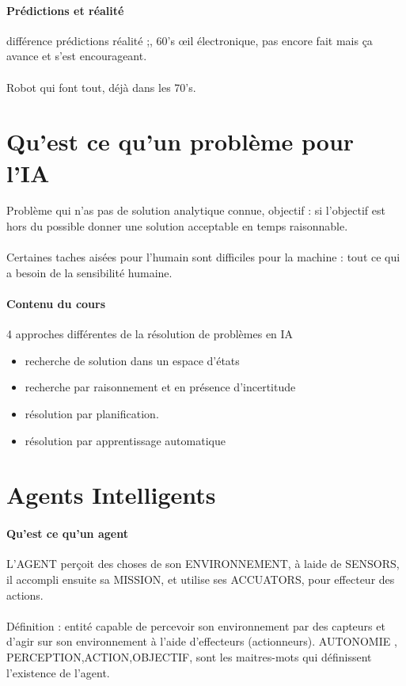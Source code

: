 \documentclass{article}
\begin{document}
\paragraph{Prédictions et réalité} différence prédictions réalité ;,  60's œil électronique, pas encore fait mais ça avance et s'est encourageant.\\\\ Robot qui font tout, déjà dans les 70's.
\section{Qu'est ce qu'un problème pour l'IA}
Problème qui n'as pas de solution analytique connue, objectif : si l'objectif est hors du possible donner une solution acceptable en temps raisonnable.\\\\Certaines taches aisées pour l'humain sont difficiles pour la machine : tout ce qui a besoin de la sensibilité humaine.

\paragraph{Contenu du cours} 4 approches différentes de la résolution de problèmes en IA
\begin{itemize}
\item recherche de solution dans un espace d'états
\item recherche par raisonnement et en présence d'incertitude
\item résolution par planification.
\item résolution par apprentissage automatique
\end{itemize}

\section{Agents Intelligents}
\paragraph{Qu'est ce qu'un agent}
L'AGENT perçoit des choses de son ENVIRONNEMENT, à laide de SENSORS,  il accompli ensuite sa MISSION, et utilise ses ACCUATORS, pour effecteur des actions.\\\\Définition : entité capable de percevoir son environnement par des capteurs et d'agir sur son environnement à l'aide d’effecteurs (actionneurs). AUTONOMIE , PERCEPTION,ACTION,OBJECTIF, sont les maitres-mots qui définissent l'existence de l'agent.
\end{document}
